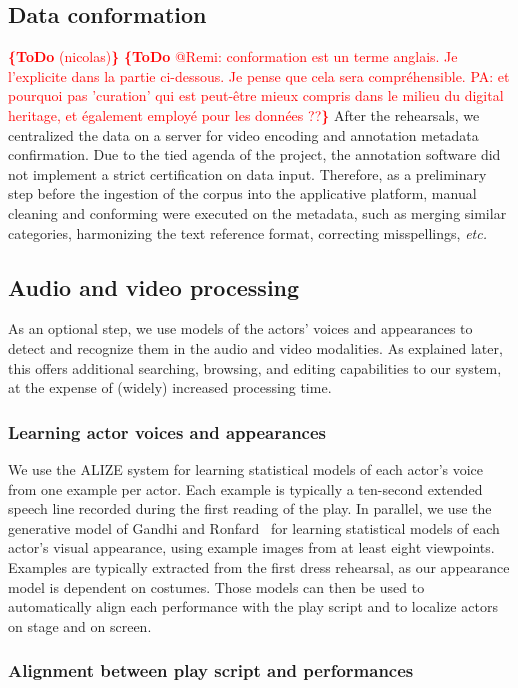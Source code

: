 \documentclass[conference]{IEEEtran}
\newcommand{\todo}[1]{\noindent\textcolor{red}{{\bf \{ToDo} #1{\bf \}}}}
\begin{document}
\subsection{Data conformation}

\todo{(nicolas)}
\todo{@Remi: conformation est un terme anglais. Je l'explicite dans la partie ci-dessous. Je pense que cela sera compréhensible. PA: et pourquoi pas 'curation' qui est peut-être mieux compris dans le milieu du digital heritage, et également employé pour les données ??}
After the rehearsals, we centralized the data on a server for video encoding and annotation metadata confirmation. Due to the tied agenda of the project, the annotation software did not implement a strict certification on data input. Therefore, as a preliminary step before the ingestion of the corpus into the applicative platform, manual cleaning and conforming were executed on the metadata, such as merging similar categories, harmonizing the text reference format, correcting misspellings, \emph{etc.}

\subsection{Audio and video processing}
As an optional step, we use models of the actors' voices and appearances to detect and recognize them in the audio and video modalities. As explained later, this offers additional searching, browsing, and editing capabilities to our system, at the expense of (widely) increased processing time.

\subsubsection{Learning actor voices and appearances}
We use the ALIZE system for learning statistical models of each actor's voice~\cite{Bonastre05}  from one example per actor.
Each example is typically a ten-second extended speech line recorded during the first reading of the play. In parallel, we use the generative model of Gandhi and Ronfard~\cite{Gandhi13} for learning statistical models of each actor's visual appearance, using example images from at least eight viewpoints. Examples are typically extracted from the first dress rehearsal, as our appearance model is dependent on costumes.  Those models can then be used to automatically align each performance with the play script and to localize actors on stage and on screen. 

\subsubsection{Alignment between play script and performances}
\end{document}
